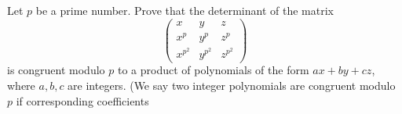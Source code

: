 Let $p$ be a prime number. Prove that the determinant of the matrix
\[
\begin{pmatrix}
x & y & z \\
x^p & y^p & z^p \\
x^{p^2} & y^{p^2} & z^{p^2}
\end{pmatrix}
\]
is congruent modulo $p$ to a product of polynomials of the form
$ax+by+cz$, where $a,b,c$ are integers. (We say two integer
polynomials are congruent modulo $p$ if corresponding coefficients
